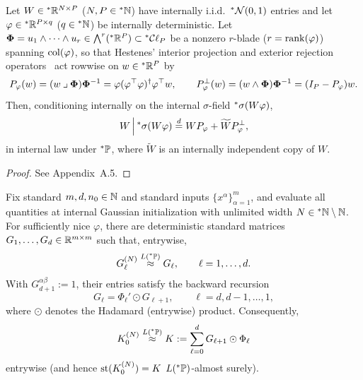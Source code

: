 \begin{lemma}\label{lem:ch2-gauss-cond}
Let $W \in {}^*\mathbb{R}^{N \times P}$ ($N, P \in {}^*\mathbb{N}$) have internally i.i.d.\ ${}^*\mathcal{N}(0, 1)$ entries and let $\varphi \in {}^*\mathbb{R}^{P \times q}$ ($q \in {}^*\mathbb{N}$) be internally deterministic. Let $\bm{\Phi} = u_1 \wedge \dots \wedge u_r \in \bigwedge^r({}^*\mathbb{R}^P) \subset {}^*\mathcal{C}\ell_P$ be a nonzero $r$-blade ($r = \operatorname{rank}(\varphi)$) spanning $\operatorname{col}(\varphi)$, so that Hestenes' interior projection and exterior rejection operators~\cite{hestenes1984clifford} act rowwise on $w \in {}^*\mathbb{R}^P$ by
\[
P_\varphi(w) = (w \mathbin{\lrcorner} \bm{\Phi})\bm{\Phi}^{-1} = \varphi(\varphi^\top \varphi)^\dagger \varphi^\top w, \qquad
P_\varphi^\perp(w) = (w \wedge \bm{\Phi})\bm{\Phi}^{-1} = (I_P - P_\varphi)w.
\]
Then, conditioning internally on the internal $\sigma$-field ${}^*\sigma(W\varphi)$,
\begin{equation}\label{eq:ch2-gauss-cond}
W \,\Big|\, {}^*\sigma(W\varphi) \stackrel{d}{=} W P_\varphi + \widetilde{W} P_\varphi^\perp,
\end{equation}
in internal law under ${}^*\mathbb{P}$, where $\widetilde{W}$ is an internally independent copy of $W$.
\end{lemma}

\begin{proof}
See Appendix~A.5.
\end{proof}

\begin{proposition}\label{prop:ch2-backward-rec}
Fix standard $m, d, n_0 \in \mathbb{N}$ and standard inputs $\{x^\alpha\}_{\alpha=1}^{m}$, and evaluate all quantities at internal Gaussian initialization with unlimited width $N \in {}^*\mathbb{N} \setminus \mathbb{N}$. For sufficiently nice $\varphi$, there are deterministic standard matrices $G_1, \dots, G_d \in \mathbb{R}^{m \times m}$ such that, entrywise,
\begin{equation}\label{eq:ch2-G-conc}
G_\ell^{(N)} \stackrel{L({}^*\mathbb{P})}{\approx} G_\ell, \qquad \ell = 1, \dots, d.
\end{equation}
With $G_{d+1}^{\alpha\beta} := 1$, their entries satisfy the backward recursion
\begin{equation}\label{eq:ch2-G-rec}
G_\ell = \Phi_\ell' \odot G_{\ell+1}, \qquad \ell = d, d-1, \dots, 1,
\end{equation}
where $\odot$ denotes the Hadamard (entrywise) product. Consequently,
\begin{equation}\label{eq:ch2-K0-conc}
K_0^{(N)} \stackrel{L({}^*\mathbb{P})}{\approx} K := \sum_{\ell=0}^{d} G_{\ell+1} \odot \Phi_\ell
\end{equation}
entrywise (and hence $\operatorname{st}(K_0^{(N)}) = K$ $L({}^*\mathbb{P})$-almost surely).
\end{proposition}

